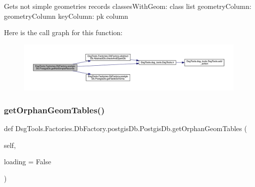 \begin{DoxyVerb}Gets not simple geometries records
classesWithGeom: class list
geometryColumn: geometryColumn
keyColumn: pk column
\end{DoxyVerb}
 Here is the call graph for this function\+:
\nopagebreak
\begin{figure}[H]
\begin{center}
\leavevmode
\includegraphics[width=350pt]{class_dsg_tools_1_1_factories_1_1_db_factory_1_1postgis_db_1_1_postgis_db_a4ace28697a1080a7f1375914f83c24f6_cgraph}
\end{center}
\end{figure}
\mbox{\label{class_dsg_tools_1_1_factories_1_1_db_factory_1_1postgis_db_1_1_postgis_db_aae3059a8f801efd4da98bbd3ebbff1c7}} 
\subsubsection{\texorpdfstring{get\+Orphan\+Geom\+Tables()}{getOrphanGeomTables()}}
{\footnotesize\ttfamily def Dsg\+Tools.\+Factories.\+Db\+Factory.\+postgis\+Db.\+Postgis\+Db.\+get\+Orphan\+Geom\+Tables (\begin{DoxyParamCaption}\item[{}]{self,  }\item[{}]{loading = {\ttfamily False} }\end{DoxyParamCaption})}

